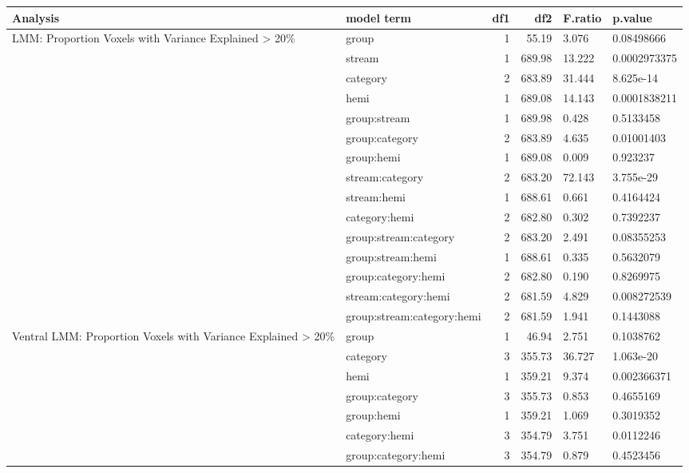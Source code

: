 \begin{table}
\centering
\begin{tabular}{llrrll}
\toprule
Analysis & model term & df1 & df2 & F.ratio & p.value\\
\midrule
LMM: Proportion Voxels with Variance Explained > 20\% & group & 1 & 55.19 & 3.076 & 0.08498666\\
 & stream & 1 & 689.98 & 13.222 & 0.0002973375\\
 & category & 2 & 683.89 & 31.444 & 8.625e-14\\
 & hemi & 1 & 689.08 & 14.143 & 0.0001838211\\
 & group:stream & 1 & 689.98 & 0.428 & 0.5133458\\
\addlinespace
 & group:category & 2 & 683.89 & 4.635 & 0.01001403\\
 & group:hemi & 1 & 689.08 & 0.009 & 0.923237\\
 & stream:category & 2 & 683.20 & 72.143 & 3.755e-29\\
 & stream:hemi & 1 & 688.61 & 0.661 & 0.4164424\\
 & category:hemi & 2 & 682.80 & 0.302 & 0.7392237\\
\addlinespace
 & group:stream:category & 2 & 683.20 & 2.491 & 0.08355253\\
 & group:stream:hemi & 1 & 688.61 & 0.335 & 0.5632079\\
 & group:category:hemi & 2 & 682.80 & 0.190 & 0.8269975\\
 & stream:category:hemi & 2 & 681.59 & 4.829 & 0.008272539\\
 & group:stream:category:hemi & 2 & 681.59 & 1.941 & 0.1443088\\
\addlinespace
Ventral LMM: Proportion Voxels with Variance Explained > 20\% & group & 1 & 46.94 & 2.751 & 0.1038762\\
 & category & 3 & 355.73 & 36.727 & 1.063e-20\\
 & hemi & 1 & 359.21 & 9.374 & 0.002366371\\
 & group:category & 3 & 355.73 & 0.853 & 0.4655169\\
 & group:hemi & 1 & 359.21 & 1.069 & 0.3019352\\
\addlinespace
 & category:hemi & 3 & 354.79 & 3.751 & 0.0112246\\
 & group:category:hemi & 3 & 354.79 & 0.879 & 0.4523456\\
\bottomrule
\end{tabular}
\end{table}
